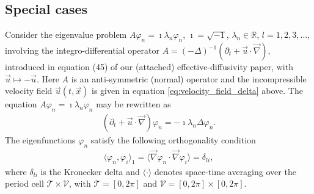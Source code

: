 \documentclass[11pt]{amsart}
\newcommand{\Tc}{\mathcal{T}}
\newcommand{\Vc}{\mathcal{V}}
\begin{document}
\subsection{Special cases}
%
Consider the eigenvalue problem $A\varphi_n=\imath\lambda_n\varphi_n$, $\imath=\sqrt{-1}$,
$\lambda_n\in\mathbb{R}$, $l=1,2,3,\ldots$, involving the integro-differential operator
$A=(-\Delta)^{-1}(\partial_t+\vec{u}\cdot\vec{\nabla})$,  
introduced in equation (45) of our (attached) effective-diffusivity
paper, with $\vec{u}\mapsto-\vec{u}$. Here $A$ is an anti-symmetric (normal)
operator and the incompressible velocity field
$\vec{u}(t,\vec{x})$
is given in equation \eqref{eq:velocity_field_delta} above. The equation $A\varphi_n=\imath\lambda_n\varphi_n$ may be
rewritten as     
%
\begin{align}\label{eq:Eig_prob}
  (\partial_t+\vec{u}\cdot\vec{\nabla})\varphi_n=-\imath\lambda_n\Delta\varphi_n.
\end{align}
%
The eigenfunctions $\varphi_n$ satisfy the following orthogonality condition
%
\begin{align}\label{eq:Orthogonal}
  \langle\varphi_n,\varphi_i\rangle_1=\langle\vec{\nabla}\varphi_n\cdot\vec{\nabla}\varphi_i\rangle=\delta_{li},
\end{align}
%
where $\delta_{li}$ is the Kronecker delta and $\langle\cdot\rangle$ denotes space-time
averaging over the period cell $\Tc\times\Vc$, with $\Tc=[0,2\pi]$ and
$\Vc=[0,2\pi]\times[0,2\pi]$.
\end{document}
